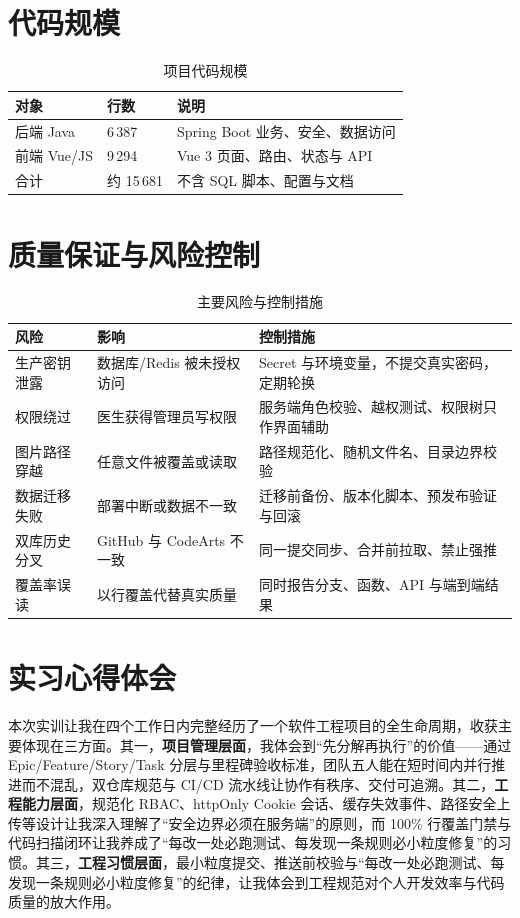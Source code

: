 \documentclass[UTF8,a4paper,12pt,openany,fontset=windows]{ctexrep}
\begin{document}
\section{代码规模}
\begin{table}[H]
  \centering
  \caption{项目代码规模}
  \begin{tabularx}{\textwidth}{p{4.0cm}p{3.0cm}L}
    \toprule
    对象 & 行数 & 说明 \\
    \midrule
    后端 Java & 6\,387 & Spring Boot 业务、安全、数据访问 \\
    前端 Vue/JS & 9\,294 & Vue 3 页面、路由、状态与 API \\
    合计 & 约 15\,681 & 不含 SQL 脚本、配置与文档 \\
    \bottomrule
  \end{tabularx}
\end{table}

\section{质量保证与风险控制}
\begin{table}[H]
  \centering
  \caption{主要风险与控制措施}
  \begin{tabularx}{\textwidth}{p{3.2cm}p{4.8cm}L}
    \toprule
    风险 & 影响 & 控制措施 \\
    \midrule
    生产密钥泄露 & 数据库/Redis 被未授权访问 & Secret 与环境变量，不提交真实密码，定期轮换 \\
    权限绕过 & 医生获得管理员写权限 & 服务端角色校验、越权测试、权限树只作界面辅助 \\
    图片路径穿越 & 任意文件被覆盖或读取 & 路径规范化、随机文件名、目录边界校验 \\
    数据迁移失败 & 部署中断或数据不一致 & 迁移前备份、版本化脚本、预发布验证与回滚 \\
    双库历史分叉 & GitHub 与 CodeArts 不一致 & 同一提交同步、合并前拉取、禁止强推 \\
    覆盖率误读 & 以行覆盖代替真实质量 & 同时报告分支、函数、API 与端到端结果 \\
    \bottomrule
  \end{tabularx}
\end{table}

\section{实习心得体会}
本次实训让我在四个工作日内完整经历了一个软件工程项目的全生命周期，收获主要体现在三方面。其一，\textbf{项目管理层面}，我体会到“先分解再执行”的价值——通过 Epic/Feature/Story/Task 分层与里程碑验收标准，团队五人能在短时间内并行推进而不混乱，双仓库规范与 CI/CD 流水线让协作有秩序、交付可追溯。其二，\textbf{工程能力层面}，规范化 RBAC、httpOnly Cookie 会话、缓存失效事件、路径安全上传等设计让我深入理解了“安全边界必须在服务端”的原则，而 100\% 行覆盖门禁与代码扫描闭环让我养成了“每改一处必跑测试、每发现一条规则必小粒度修复”的习惯。其三，\textbf{工程习惯层面}，最小粒度提交、推送前校验与“每改一处必跑测试、每发现一条规则必小粒度修复”的纪律，让我体会到工程规范对个人开发效率与代码质量的放大作用。
\end{document}
